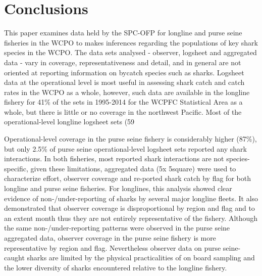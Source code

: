 \documentclass[12pt]{SCreport}
\begin{document}
 

\section{Conclusions }

This paper examines data held by the SPC-OFP for longline and purse seine fisheries in the WCPO to makes inferences regarding the populations of key shark species in the WCPO. The data sets analysed - observer, logsheet and aggregated data - vary in coverage, representativeness and detail, and in general are not oriented at reporting information on bycatch species such as sharks. Logsheet data at the operational level is most useful in assessing shark catch and catch rates in the WCPO as a whole, however, such data are available in the longline fishery for 41\% of the sets in 1995-2014 for the WCPFC Statistical Area as a whole, but there is little or no coverage in the northwest Pacific. Most of the operational-level longline logsheet sets (59%

Operational-level coverage in the purse seine fishery is considerably higher (87\%), but only 2.5\% of purse seine operational-level logsheet sets reported any shark interactions. In both fisheries, most reported shark interactions are not species-specific, given these limitations, aggregated data (5\degree x 5\degree square) were used to characterize effort, observer coverage and re-ported shark catch by flag for both longline and purse seine fisheries. For longlines, this analysis showed clear evidence of non-/under-reporting of sharks by several major longline fleets. It also demonstrated that observer coverage is disproportional by region and flag and to an extent month thus they are not entirely representative of the fishery. Although the same non-/under-reporting patterns were observed in the purse seine aggregated data, observer coverage in the purse seine fishery is more representative by region and flag. Nevertheless observer data on purse seine-caught sharks are limited by the physical practicalities of on board sampling and the lower diversity of sharks encountered relative to the longline fishery.
\end{document}
